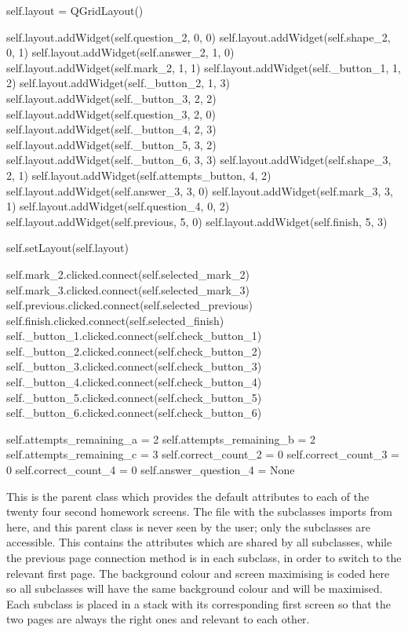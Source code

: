 \begin{python}
        self.layout = QGridLayout()

        self.layout.addWidget(self.question_2, 0, 0)
        self.layout.addWidget(self.shape_2, 0, 1)
        self.layout.addWidget(self.answer_2, 1, 0)
        self.layout.addWidget(self.mark_2, 1, 1)
        self.layout.addWidget(self._button_1, 1, 2)
        self.layout.addWidget(self._button_2, 1, 3)
        self.layout.addWidget(self._button_3, 2, 2)
        self.layout.addWidget(self.question_3, 2, 0)
        self.layout.addWidget(self._button_4, 2, 3)
        self.layout.addWidget(self._button_5, 3, 2)
        self.layout.addWidget(self._button_6, 3, 3)
        self.layout.addWidget(self.shape_3, 2, 1)
        self.layout.addWidget(self.attempts_button, 4, 2)
        self.layout.addWidget(self.answer_3, 3, 0)
        self.layout.addWidget(self.mark_3, 3, 1)
        self.layout.addWidget(self.question_4, 0, 2)
        self.layout.addWidget(self.previous, 5, 0)
        self.layout.addWidget(self.finish, 5, 3)

        self.setLayout(self.layout)

        self.mark_2.clicked.connect(self.selected_mark_2)
        self.mark_3.clicked.connect(self.selected_mark_3)
        self.previous.clicked.connect(self.selected_previous)
        self.finish.clicked.connect(self.selected_finish)
        self._button_1.clicked.connect(self.check_button_1)
        self._button_2.clicked.connect(self.check_button_2)
        self._button_3.clicked.connect(self.check_button_3)
        self._button_4.clicked.connect(self.check_button_4)
        self._button_5.clicked.connect(self.check_button_5)
        self._button_6.clicked.connect(self.check_button_6)

        self.attempts_remaining_a = 2
        self.attempts_remaining_b = 2
        self.attempts_remaining_c = 3
        self.correct_count_2 = 0
        self.correct_count_3 = 0
        self.correct_count_4 = 0
        self.answer_question_4 = None
\end{python}

This is the parent class which provides the default attributes to each of the twenty four second homework screens. The file with the subclasses imports from here, and this parent class is never seen by the user; only the subclasses are accessible. This contains the attributes which are shared by all subclasses, while the previous page connection method is in each subclass, in order to switch to the relevant first page. The background colour and screen maximising is coded here so all subclasses will have the same background colour and will be maximised. Each subclass is placed in a stack with its corresponding first screen so that the two pages are always the right ones and relevant to each other.

